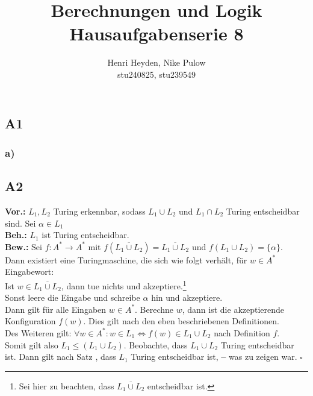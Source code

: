 \documentclass[12pt, a4paper]{article}
\title{Berechnungen und Logik\\Hausaufgabenserie 8}
\author{Henri Heyden, Nike Pulow \\ \small stu240825, stu239549}
\date{}
\newcommand*{\qed}{\null\nobreak\hfill\ensuremath{\square}}
\newcommand*{\gedanke}{\textbf{-- }}
\newcommand*{\gap}{\text{ }}
\newcommand*{\vor}{\textbf{Vor.:} \gap}
\newcommand*{\beh}{\textbf{Beh.:} \gap}
\newcommand*{\bew}{\textbf{Bew.:} \gap}
\begin{document}
\maketitle

\onehalfspacing
\vspace*{-2cm}
\subsection*{A1}
\subsubsection*{a)}
\subsection*{A2}
\vor \(L_1, L_2\) Turing erkennbar, sodass \(L_1 \cup L_2\) und \(L_1 \cap L_2\) Turing entscheidbar sind. Sei \(\alpha \in L_1\) \\
\beh \(L_1\) ist Turing entscheidbar. \\
\bew Sei \(f : A^* \rightarrow A^*\) mit \(f(\overline{L_1 \cup L_2}) = \overline{L_1 \cup L_2}\) und \(f(L_1 \cup L_2) = \{\alpha\}\). \\
Dann existiert eine Turingmaschine, die sich wie folgt verhält, für \(w \in A^*\) Eingabewort: \\
Ist \(w \in \overline{L_1 \cup L_2}\), dann tue nichts und akzeptiere.\footnote[1]{Sei hier zu beachten, dass \(\overline{L_1 \cup L_2}\) entscheidbar ist.} \\
Sonst leere die Eingabe und schreibe \(\alpha\) hin und akzeptiere. \\
Dann gilt für alle Eingaben \(w \in A^*\). Berechne \(w\), dann ist die akzeptierende Konfiguration \(f(w)\). Dies gilt nach den eben beschriebenen Definitionen. \\
Des Weiteren gilt: \(\forall w \in A^*: w \in L_1 \Leftrightarrow f(w) \in L_1 \cup L_2\) nach Definition \(f\). \\ Somit gilt also \(L_1 \le (L_1 \cup L_2)\). Beobachte, dass \(L_1 \cup L_2\) Turing entscheidbar ist.
Dann gilt nach Satz , dass \(L_1\) Turing entscheidbar ist, \gedanke was zu zeigen war. \qed
\end{document}
